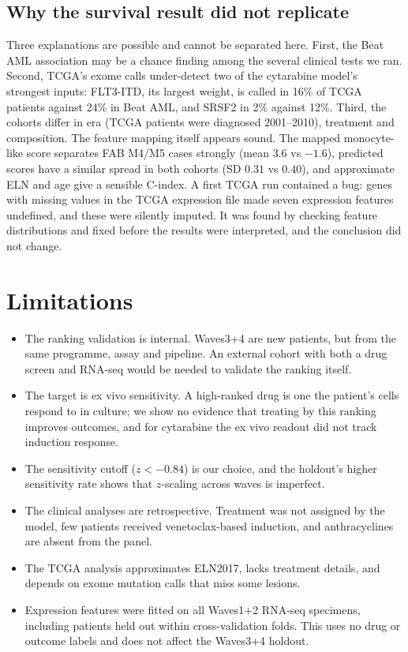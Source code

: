 \documentclass[11pt,logo,nonumbering]{preprint}
\newcommand{\z}{z}
\begin{document}
\subsection{Why the survival result did not replicate}
Three explanations are possible and cannot be separated here. First, the Beat AML association may be a chance finding among the several clinical tests we ran. Second, TCGA's exome calls under-detect two of the cytarabine model's strongest inputs: FLT3-ITD, its largest weight, is called in 16\% of TCGA patients against 24\% in Beat AML, and SRSF2 in 2\% against 12\%. Third, the cohorts differ in era (TCGA patients were diagnosed 2001--2010), treatment and composition. The feature mapping itself appears sound. The mapped monocyte-like score separates FAB M4/M5 cases strongly (mean $3.6$ vs $-1.6$), predicted scores have a similar spread in both cohorts (SD $0.31$ vs $0.40$), and approximate ELN and age give a sensible C-index. A first TCGA run contained a bug: genes with missing values in the TCGA expression file made seven expression features undefined, and these were silently imputed. It was found by checking feature distributions and fixed before the results were interpreted, and the conclusion did not change.

\section{Limitations}
\begin{itemize}[leftmargin=1.5em,itemsep=2pt]
\item The ranking validation is internal. Waves3+4 are new patients, but from the same programme, assay and pipeline. An external cohort with both a drug screen and RNA-seq would be needed to validate the ranking itself.
\item The target is ex vivo sensitivity. A high-ranked drug is one the patient's cells respond to in culture; we show no evidence that treating by this ranking improves outcomes, and for cytarabine the ex vivo readout did not track induction response.
\item The sensitivity cutoff ($\z<-0.84$) is our choice, and the holdout's higher sensitivity rate shows that $\z$-scaling across waves is imperfect.
\item The clinical analyses are retrospective. Treatment was not assigned by the model, few patients received venetoclax-based induction, and anthracyclines are absent from the panel.
\item The TCGA analysis approximates ELN2017, lacks treatment details, and depends on exome mutation calls that miss some lesions.
\item Expression features were fitted on all Waves1+2 RNA-seq specimens, including patients held out within cross-validation folds. This uses no drug or outcome labels and does not affect the Waves3+4 holdout.
\end{itemize}
\end{document}
